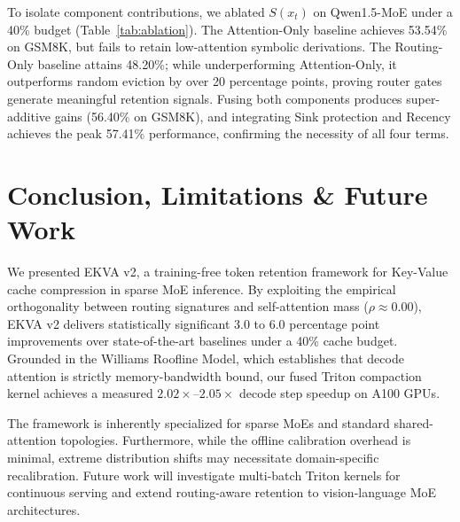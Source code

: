 \documentclass[conference]{IEEEtran}
\begin{document}
To isolate component contributions, we ablated $S(x_t)$ on Qwen1.5-MoE under a 40\% budget (Table~\ref{tab:ablation}). The Attention-Only baseline achieves 53.54\% on GSM8K, but fails to retain low-attention symbolic derivations. The Routing-Only baseline attains 48.20\%; while underperforming Attention-Only, it outperforms random eviction by over 20 percentage points, proving router gates generate meaningful retention signals. Fusing both components produces super-additive gains (56.40\% on GSM8K), and integrating Sink protection and Recency achieves the peak 57.41\% performance, confirming the necessity of all four terms.

\section{Conclusion, Limitations \& Future Work}
We presented EKVA v2, a training-free token retention framework for Key-Value cache compression in sparse MoE inference. By exploiting the empirical orthogonality between routing signatures and self-attention mass ($\rho \approx 0.00$), EKVA v2 delivers statistically significant 3.0 to 6.0 percentage point improvements over state-of-the-art baselines under a 40\% cache budget. Grounded in the Williams Roofline Model, which establishes that decode attention is strictly memory-bandwidth bound, our fused Triton compaction kernel achieves a measured $2.02\times$--$2.05\times$ decode step speedup on A100 GPUs. 

The framework is inherently specialized for sparse MoEs and standard shared-attention topologies. Furthermore, while the offline calibration overhead is minimal, extreme distribution shifts may necessitate domain-specific recalibration. Future work will investigate multi-batch Triton kernels for continuous serving and extend routing-aware retention to vision-language MoE architectures.



\end{document}
